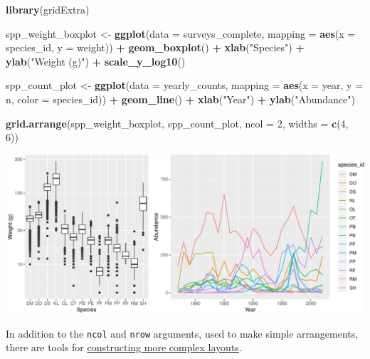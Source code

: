 \documentclass[]{book}
\newenvironment{Shaded}{\begin{snugshade}}{\end{snugshade}}
\newcommand{\KeywordTok}[1]{\textcolor[rgb]{0.13,0.29,0.53}{\textbf{#1}}}
\newcommand{\DataTypeTok}[1]{\textcolor[rgb]{0.13,0.29,0.53}{#1}}
\newcommand{\DecValTok}[1]{\textcolor[rgb]{0.00,0.00,0.81}{#1}}
\newcommand{\StringTok}[1]{\textcolor[rgb]{0.31,0.60,0.02}{#1}}
\newcommand{\OperatorTok}[1]{\textcolor[rgb]{0.81,0.36,0.00}{\textbf{#1}}}
\newcommand{\NormalTok}[1]{#1}
\begin{document}
\begin{Shaded}
\begin{Highlighting}[]
\KeywordTok{library}\NormalTok{(gridExtra)}

\NormalTok{spp_weight_boxplot <-}\StringTok{ }\KeywordTok{ggplot}\NormalTok{(}\DataTypeTok{data =}\NormalTok{ surveys_complete, }
                             \DataTypeTok{mapping =} \KeywordTok{aes}\NormalTok{(}\DataTypeTok{x =}\NormalTok{ species_id, }\DataTypeTok{y =}\NormalTok{ weight)) }\OperatorTok{+}
\StringTok{  }\KeywordTok{geom_boxplot}\NormalTok{() }\OperatorTok{+}
\StringTok{  }\KeywordTok{xlab}\NormalTok{(}\StringTok{"Species"}\NormalTok{) }\OperatorTok{+}\StringTok{ }\KeywordTok{ylab}\NormalTok{(}\StringTok{"Weight (g)"}\NormalTok{) }\OperatorTok{+}
\StringTok{  }\KeywordTok{scale_y_log10}\NormalTok{()}

\NormalTok{spp_count_plot <-}\StringTok{ }\KeywordTok{ggplot}\NormalTok{(}\DataTypeTok{data =}\NormalTok{ yearly_counts, }
                         \DataTypeTok{mapping =} \KeywordTok{aes}\NormalTok{(}\DataTypeTok{x =}\NormalTok{ year, }\DataTypeTok{y =}\NormalTok{ n, }\DataTypeTok{color =}\NormalTok{ species_id)) }\OperatorTok{+}
\StringTok{  }\KeywordTok{geom_line}\NormalTok{() }\OperatorTok{+}\StringTok{ }
\StringTok{  }\KeywordTok{xlab}\NormalTok{(}\StringTok{"Year"}\NormalTok{) }\OperatorTok{+}\StringTok{ }\KeywordTok{ylab}\NormalTok{(}\StringTok{"Abundance"}\NormalTok{)}

\KeywordTok{grid.arrange}\NormalTok{(spp_weight_boxplot, spp_count_plot, }\DataTypeTok{ncol =} \DecValTok{2}\NormalTok{, }\DataTypeTok{widths =} \KeywordTok{c}\NormalTok{(}\DecValTok{4}\NormalTok{, }\DecValTok{6}\NormalTok{))}
\end{Highlighting}
\end{Shaded}

\includegraphics{img/R-ecology-gridarrange-example-1.pdf}

In addition to the \texttt{ncol} and \texttt{nrow} arguments, used to
make simple arrangements, there are tools for
\href{https://cran.r-project.org/web/packages/gridExtra/vignettes/arrangeGrob.html}{constructing
more complex layouts}.
\end{document}
